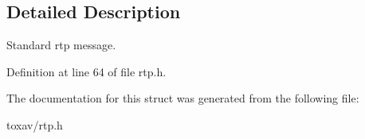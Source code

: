 \subsection{Detailed Description}
Standard rtp message. 

Definition at line 64 of file rtp.\+h.



The documentation for this struct was generated from the following file\+:\begin{DoxyCompactItemize}
\item 
toxav/rtp.\+h\end{DoxyCompactItemize}
